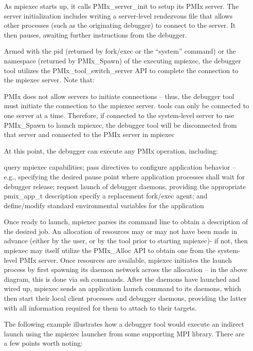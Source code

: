 As mpiexec starts up, it calls PMIx_server_init to setup its PMIx server. The server initialization includes writing a server-level rendezvous file that allows other processes (such as the originating debugger) to connect to the server. It then pauses, awaiting further instructions from the debugger.

Armed with the pid (returned by fork/exec or the “system” command) or the namespace (returned by PMIx_Spawn) of the executing mpiexec, the debugger tool utilizes the PMIx_tool_switch_server API to complete the connection to the mpiexec server. Note that:

    PMIx does not allow servers to initiate connections – thus, the debugger tool must initiate the connection to the mpiexec server.
    tools can only be connected to one server at a time. Therefore, if connected to the system-level server to use PMIx_Spawn to launch mpiexec, the debugger tool will be disconnected from that server and connected to the PMIx server in mpiexec

At this point, the debugger can execute any PMIx operation, including:

    query mpiexec capabilities;
    pass directives to configure application behavior – e.g., specifying the desired pause point where application processes shall wait for debugger release;
    request launch of debugger daemons, providing the appropriate pmix_app_t description
    specify a replacement fork/exec agent; and
    define/modify standard environmental variables for the application

Once ready to launch, mpiexec parses its command line to obtain a description of the desired job. An allocation of resources may or may not have been made in advance (either by the user, or by the tool prior to starting mpiexec)- if not, then mpiexec may itself utilize the PMIx_Alloc API to obtain one from the system-level PMIx server. Once resources are available, mpiexec initiates the launch process by first spawning its daemon network across the allocation – in the above diagram, this is done via ssh commands. After the daemons have launched and wired up, mpiexec sends an application launch command to its daemons, which then start their local client processes and debugger daemons, providing the latter with all information required for them to attach to their targets.

The following example illustrates how a debugger tool would execute an indirect launch using the mpiexec launcher from some supporting MPI library. There are a few points worth noting:

